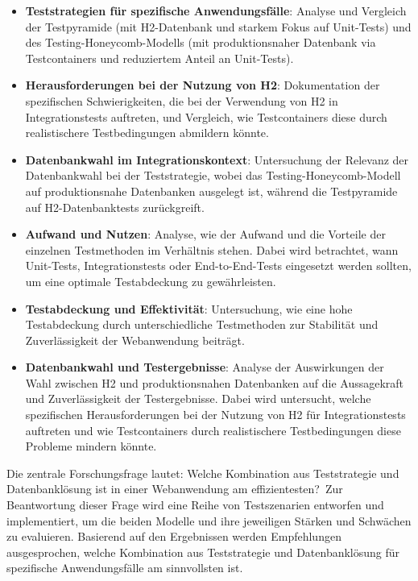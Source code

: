 \begin{itemize}
	\item \textbf{Teststrategien für spezifische Anwendungsfälle}: Analyse und Vergleich der Testpyramide (mit H2-Datenbank und starkem Fokus auf Unit-Tests) und des Testing-Honeycomb-Modells (mit produktionsnaher Datenbank via Testcontainers und reduziertem Anteil an Unit-Tests).
	
	\item \textbf{Herausforderungen bei der Nutzung von H2}: Dokumentation der spezifischen Schwierigkeiten, die bei der Verwendung von H2 in Integrationstests auftreten, und Vergleich, wie Testcontainers diese durch realistischere Testbedingungen abmildern könnte.
	
	\item \textbf{Datenbankwahl im Integrationskontext}: Untersuchung der Relevanz der Datenbankwahl bei der Teststrategie, wobei das Testing-Honeycomb-Modell auf produktionsnahe Datenbanken ausgelegt ist, während die Testpyramide auf H2-Datenbanktests zurückgreift.
	
	\item \textbf{Aufwand und Nutzen}: Analyse, wie der Aufwand und die Vorteile der einzelnen Testmethoden im Verhältnis stehen. Dabei wird betrachtet,  wann Unit-Tests, Integrationstests oder End-to-End-Tests eingesetzt werden sollten, um eine optimale Testabdeckung zu gewährleisten.
	
	\item \textbf{Testabdeckung und Effektivität}: Untersuchung, wie eine hohe Testabdeckung durch unterschiedliche Testmethoden zur Stabilität und Zuverlässigkeit der Webanwendung beiträgt.
	
	\item \textbf{Datenbankwahl und Testergebnisse}: Analyse der Auswirkungen der Wahl zwischen H2 und produktionsnahen Datenbanken auf die Aussagekraft und Zuverlässigkeit der Testergebnisse. Dabei wird untersucht, welche spezifischen Herausforderungen bei der Nutzung von H2 für Integrationstests auftreten und wie Testcontainers durch realistischere Testbedingungen diese Probleme mindern könnte.
\end{itemize}

Die zentrale Forschungsfrage lautet: \glqq Welche Kombination aus Teststrategie und Datenbanklösung ist in einer Webanwendung am effizientesten?\grqq \ Zur Beantwortung dieser Frage wird eine Reihe von Testszenarien entworfen und implementiert, um die beiden Modelle und ihre jeweiligen Stärken und Schwächen zu evaluieren. Basierend auf den Ergebnissen werden Empfehlungen ausgesprochen, welche Kombination aus Teststrategie und Datenbanklösung für spezifische Anwendungsfälle am sinnvollsten ist.
